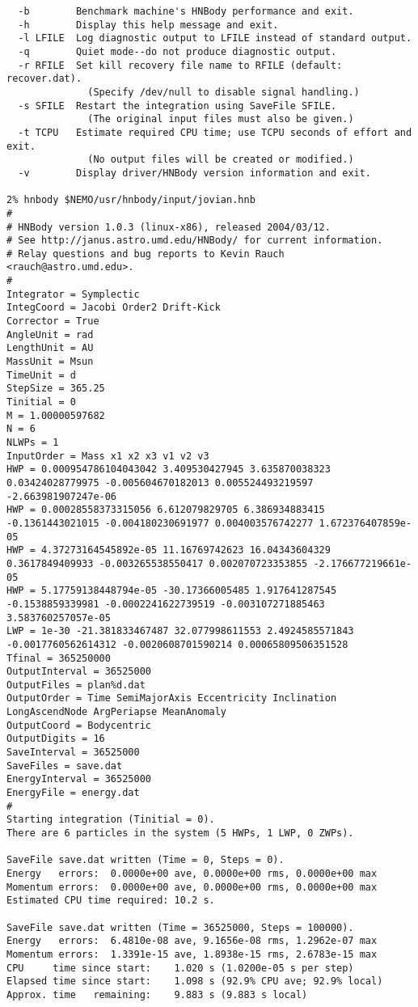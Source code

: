 {\begin{verbatim}
  -b        Benchmark machine's HNBody performance and exit.
  -h        Display this help message and exit.
  -l LFILE  Log diagnostic output to LFILE instead of standard output.
  -q        Quiet mode--do not produce diagnostic output.
  -r RFILE  Set kill recovery file name to RFILE (default: recover.dat).
              (Specify /dev/null to disable signal handling.)
  -s SFILE  Restart the integration using SaveFile SFILE.
              (The original input files must also be given.)
  -t TCPU   Estimate required CPU time; use TCPU seconds of effort and exit.
              (No output files will be created or modified.)
  -v        Display driver/HNBody version information and exit.

2% hnbody $NEMO/usr/hnbody/input/jovian.hnb
#
# HNBody version 1.0.3 (linux-x86), released 2004/03/12.
# See http://janus.astro.umd.edu/HNBody/ for current information.
# Relay questions and bug reports to Kevin Rauch <rauch@astro.umd.edu>.
#
Integrator = Symplectic
IntegCoord = Jacobi Order2 Drift-Kick
Corrector = True
AngleUnit = rad
LengthUnit = AU
MassUnit = Msun
TimeUnit = d
StepSize = 365.25
Tinitial = 0
M = 1.00000597682
N = 6
NLWPs = 1
InputOrder = Mass x1 x2 x3 v1 v2 v3
HWP = 0.000954786104043042 3.409530427945 3.635870038323 0.03424028779975 -0.005604670182013 0.005524493219597 -2.663981907247e-06
HWP = 0.00028558373315056 6.612079829705 6.386934883415 -0.1361443021015 -0.004180230691977 0.004003576742277 1.672376407859e-05
HWP = 4.37273164545892e-05 11.16769742623 16.04343604329 0.3617849409933 -0.003265538550417 0.002070723353855 -2.176677219661e-05
HWP = 5.17759138448794e-05 -30.17366005485 1.917641287545 -0.1538859339981 -0.0002241622739519 -0.003107271885463 3.583760257057e-05
LWP = 1e-30 -21.381833467487 32.077998611553 2.4924585571843 -0.0017760562614312 -0.0020608701590214 0.00065809506351528
Tfinal = 365250000
OutputInterval = 36525000
OutputFiles = plan%d.dat
OutputOrder = Time SemiMajorAxis Eccentricity Inclination LongAscendNode ArgPeriapse MeanAnomaly
OutputCoord = Bodycentric
OutputDigits = 16
SaveInterval = 36525000
SaveFiles = save.dat
EnergyInterval = 36525000
EnergyFile = energy.dat
#
Starting integration (Tinitial = 0).
There are 6 particles in the system (5 HWPs, 1 LWP, 0 ZWPs).
 
SaveFile save.dat written (Time = 0, Steps = 0).
Energy   errors:  0.0000e+00 ave, 0.0000e+00 rms, 0.0000e+00 max
Momentum errors:  0.0000e+00 ave, 0.0000e+00 rms, 0.0000e+00 max
Estimated CPU time required: 10.2 s.
 
SaveFile save.dat written (Time = 36525000, Steps = 100000).
Energy   errors:  6.4810e-08 ave, 9.1656e-08 rms, 1.2962e-07 max
Momentum errors:  1.3391e-15 ave, 1.8938e-15 rms, 2.6783e-15 max
CPU     time since start:    1.020 s (1.0200e-05 s per step)
Elapsed time since start:    1.098 s (92.9% CPU ave; 92.9% local)
Approx. time   remaining:    9.883 s (9.883 s local)
 

\end{verbatim}}
